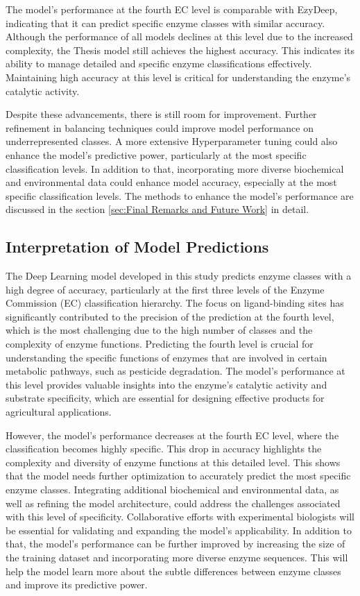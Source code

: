 The model's performance at the fourth EC level is comparable with EzyDeep, indicating that it can predict specific enzyme classes with similar accuracy. Although the performance of all models declines at this level due to the increased complexity, the Thesis model still achieves the highest accuracy. This indicates its ability to manage detailed and specific enzyme classifications effectively. Maintaining high accuracy at this level is critical for understanding the enzyme's catalytic activity.

Despite these advancements, there is still room for improvement. Further refinement in balancing techniques could improve model performance on underrepresented classes. A more extensive Hyperparameter tuning could also enhance the model's predictive power, particularly at the most specific classification levels. In addition to that, incorporating more diverse biochemical and environmental data could enhance model accuracy, especially at the most specific classification levels. The methods to enhance the model's performance are discussed in the section \ref{sec:Final Remarks and Future Work} in detail.

\subsection{Interpretation of Model Predictions}
\label{sec:Interpretation of Model Predictions}

The Deep Learning model developed in this study predicts enzyme classes with a high degree of accuracy, particularly at the first three levels of the Enzyme Commission (EC) classification hierarchy. The focus on ligand-binding sites has significantly contributed to the precision of the prediction at the fourth level, which is the most challenging due to the high number of classes and the complexity of enzyme functions. Predicting the fourth level is crucial for understanding the specific functions of enzymes that are involved in certain metabolic pathways, such as pesticide degradation. The model's performance at this level provides valuable insights into the enzyme's catalytic activity and substrate specificity, which are essential for designing effective products for agricultural applications.

However, the model's performance decreases at the fourth EC level, where the classification becomes highly specific. This drop in accuracy highlights the complexity and diversity of enzyme functions at this detailed level. This shows that the model needs further optimization to accurately predict the most specific enzyme classes. Integrating additional biochemical and environmental data, as well as refining the model architecture, could address the challenges associated with this level of specificity. Collaborative efforts with experimental biologists will be essential for validating and expanding the model’s applicability. In addition to that, the model's performance can be further improved by increasing the size of the training dataset and incorporating more diverse enzyme sequences. This will help the model learn more about the subtle differences between enzyme classes and improve its predictive power.


